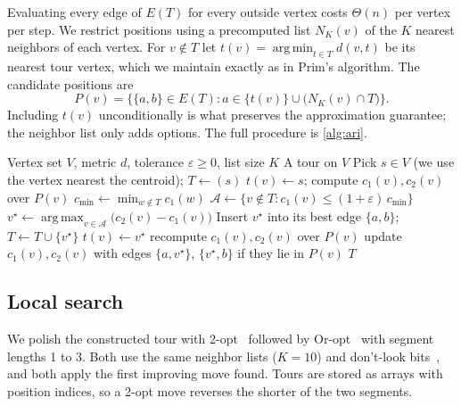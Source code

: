 \documentclass[11pt]{article}
\theoremstyle{definition}
\theoremstyle{remark}
\DeclareMathOperator*{\argmin}{arg\,min}
\DeclareMathOperator*{\argmax}{arg\,max}
\begin{document}
Evaluating every edge of $E(T)$ for every outside vertex costs $\Theta(n)$ per vertex per step. We restrict positions using a precomputed list $N_K(v)$ of the $K$ nearest neighbors of each vertex. For $v \notin T$ let $t(v) = \argmin_{t \in T} d(v, t)$ be its nearest tour vertex, which we maintain exactly as in Prim's algorithm. The candidate positions are
\begin{equation}
  P(v) = \bigl\{ \{a, b\} \in E(T) : a \in \{t(v)\} \cup \bigl(N_K(v) \cap T\bigr) \bigr\}.
  \label{eq:positions}
\end{equation}
Including $t(v)$ unconditionally is what preserves the approximation guarantee; the neighbor list only adds options. The full procedure is \cref{alg:ari}.

\begin{algorithm}[t]
\caption{Admissible Regret Insertion (ARI)}
\label{alg:ari}
\begin{algorithmic}[1]
\Require Vertex set $V$, metric $d$, tolerance $\varepsilon \ge 0$, list size $K$
\Ensure A tour on $V$
\State Pick $s \in V$ (we use the vertex nearest the centroid); $T \gets (s)$
  \State $t(v) \gets s$; compute $c_1(v), c_2(v)$ over $P(v)$
\EndFor
{}
  \State $c_{\min} \gets \min_{w \notin T} c_1(w)$
  \State $\mathcal{A} \gets \{ v \notin T : c_1(v) \le (1+\varepsilon)\, c_{\min} \}$
  \State $v^\star \gets \argmax_{v \in \mathcal{A}} \bigl(c_2(v) - c_1(v)\bigr)$ 
  \State Insert $v^\star$ into its best edge $\{a, b\}$; $T \gets T \cup \{v^\star\}$
     $t(v) \gets v^\star$ \EndIf
      \State recompute $c_1(v), c_2(v)$ over $P(v)$ 
    \Else
      \State update $c_1(v), c_2(v)$ with edges $\{a, v^\star\}$, $\{v^\star, b\}$ if they lie in $P(v)$
    \EndIf
  \EndFor
\EndWhile
\State \Return $T$
\end{algorithmic}
\end{algorithm}

\subsection{Local search}

We polish the constructed tour with 2-opt~\cite{croes1958} followed by Or-opt~\cite{or1976} with segment lengths 1 to 3. Both use the same neighbor lists ($K = 10$) and don't-look bits~\cite{bentley1992}, and both apply the first improving move found. Tours are stored as arrays with position indices, so a 2-opt move reverses the shorter of the two segments.
\end{document}
